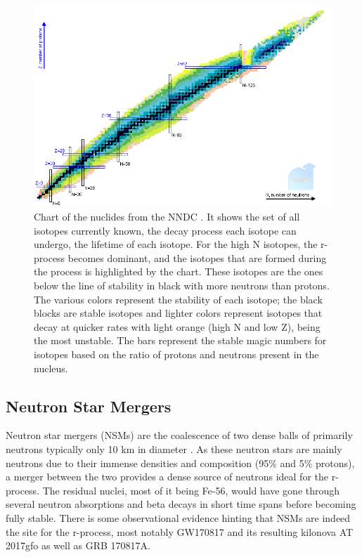 \documentclass[11pt,a4paper]{article}
\begin{document}
\begin{figure}[h!]
  \includegraphics[width=1\textwidth , scale = .5]{nuclides_chart.png}
  \caption{Chart of the nuclides from the NNDC \cite{NNDC_2008}. It shows the set of all isotopes currently known, the decay process each isotope can undergo, the lifetime of each isotope. For the high N isotopes, the r-process becomes dominant, and the isotopes that are formed during the process is highlighted by the chart. These isotopes are the ones below the line of stability in black with more neutrons than protons. The various colors represent the stability of each isotope; the black blocks are stable isotopes and lighter colors represent isotopes that decay at quicker rates with light orange (high N and low Z), being the most unstable. The bars represent the stable magic numbers for isotopes based on the ratio of protons and neutrons present in the nucleus.}
\end{figure}

\subsection{Neutron Star Mergers}

Neutron star mergers (NSMs) are the coalescence of two dense balls of primarily neutrons typically only 10 km in diameter \cite{Radice_2020} . As these neutron stars are mainly neutrons due to their immense densities and composition (95\% and 5\% protons), a merger between the two provides a dense source of neutrons ideal for the r-process. The residual nuclei, most of it being Fe-56, would have gone through several neutron absorptions and beta decays in short time spans before becoming fully stable. There is some observational evidence hinting that NSMs are indeed the site for the r-process, most notably GW170817 and its resulting kilonova AT 2017gfo as well as GRB 170817A. 
\end{document}
